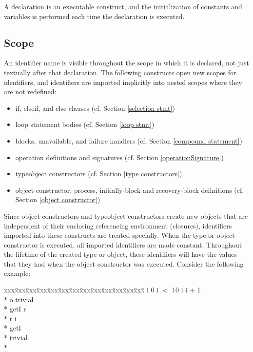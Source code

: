 A declaration is an executable construct, and the initialization of
constants and variables is performed each time the declaration is executed.

\subsection{Scope}
An identifier name is visible
throughout the scope in which it is declared, not just textually after
that declaration.  The following constructs open new scopes for
identifiers, and identifiers are imported implicitly into nested
scopes where they are not redefined:
\begin{itemize}
  \item{} if, elseif, and else clauses (cf. Section \ref{selection stmt})
  \item{} loop statement bodies (cf. Section \ref{loop stmt})
  \item{} blocks, unavailable, and failure handlers (cf. 
            Section \ref{compound statement})
  \item{} operation definitions and signatures (cf. Section 
            \ref{operationSignature})
  \item{} typeobject constructors (cf. Section \ref{type constructors})
  \item{} object constructor, process, initially-block and
           recovery-block definitions (cf. Section \ref{object constructor})
\end{itemize}

Since object constructors and typeobject constructors create new objects
that are independent of their enclosing referencing environment (closures), 
identifiers imported into these constructs
are treated specially.  When the type or object constructor is
executed, all imported identifiers are made constant.
Throughout the lifetime of the created type or object, these
identifiers will have the values that they had when the object constructor
was executed. Consider the following example:

{\small\it\begin{minipage}{\textwidth}\begin{tabbing}
xxx\=xxx\=xxx\=xxx\=xxx\=xxx\=xxx\=xxx\=xxx\=xxx\=xxx\=xxx\=xxx\=\+\kill%
 i \CO{}  \assign{} 0  i $<$ 10  i \assign i $+$ 1\+\\*{}%
  o \assign{}  trivial\+\\*{}%
      getI \returns{} \/\LB{}r \CO{} \/\RB{}\+\\*{}%
      r \assign{} i\-\\*{}%
     getI\-\\*{}%
   trivial\-\\*{}%
 
\end{tabbing}\end{minipage}}

